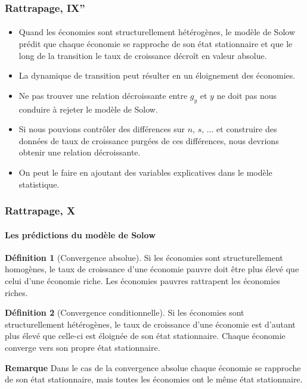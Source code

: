 \documentclass[10pt,notheorems]{beamer}
\theoremstyle{plain}
\theoremstyle{definition} %
\newtheorem{definition}{Définition}
\begin{document}
\begin{frame}
  \frametitle{Rattrapage, IX''}
  \framesubtitle{}

  \begin{itemize}

  \item Quand les économies sont structurellement hétérogènes, le modèle de
    Solow prédit que chaque économie se rapproche de son état stationnaire et
    que le long de la transition le taux de croissance décroît en valeur
    absolue.\newline

  \item La dynamique de transition peut résulter en un éloignement des
    économies.\newline

  \item Ne pas trouver une relation décroissante entre $g_y$ et $y$ ne doit pas
    nous conduire à rejeter le modèle de Solow.\newline

  \item Si nous pouvions contrôler des différences sur $n$, $s$, ... et
    construire des données de taux de croissance purgées de ces différences,
    nous devrions obtenir une relation décroissante.\newline

  \item On peut le faire en ajoutant des variables explicatives dans le modèle
    statistique.

  \end{itemize}

\end{frame}


\begin{frame}
  \frametitle{Rattrapage, X}
  \framesubtitle{Les prédictions du modèle de Solow}

  \begin{definition}[Convergence absolue]
    Si les économies sont structurellement homogènes, le taux de croissance
    d'une économie pauvre doit être plus élevé que celui d'une économie riche.
    Les économies pauvres rattrapent les économies riches.
  \end{definition}

  \bigskip

  \begin{definition}[Convergence conditionnelle]
    Si les économies sont structurellement hétérogènes, le taux de croissance
    d'une économie est d'autant plus élevé que celle-ci est éloignée de son état
    stationnaire. Chaque économie converge vers son propre état stationnaire.
  \end{definition}

  \bigskip

  \textbf{Remarque} Dans le cas de la convergence absolue chaque économie se
  rapproche de son état stationnaire, mais toutes les économies ont le même état
  stationnaire.
\end{frame}
\end{document}
